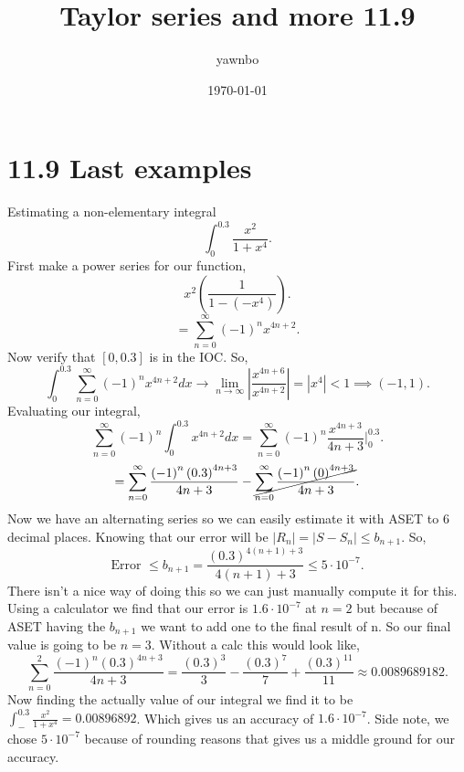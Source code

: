 \documentclass[a4paper]{article}
\title{Taylor series and more 11.9}
\author{yawnbo}
\date{\today}
\begin{document}
\maketitle
\section{11.9 Last examples}%
\label{sec:11.9 Last example}
\begin{exampleblock}{Estimating a non-elementary integral}
\[
\int_{ 0 }^{ 0.3 } \frac{ x^2 }{ 1+x^{ 4 } }
.\] 
First make a power series for our function,
\[
x^2\left( \frac{ 1 }{ 1-\left( -x^{ 4 } \right)  }  \right) 
.\] 
\[
=\sum_{ n=0 } ^{ \infty } \left( -1 \right) ^{ n }x^{ 4n+2 }
.\] 
Now verify that $ \left[ 0,0.3 \right]  $ is in the IOC. So,
\[
\int_{ 0 }^{ 0.3 } \sum_{ n=0 } ^{ \infty } \left( -1 \right) ^{ n }x^{ 4n+2 }dx \to \lim_{ n \to \infty} \left| \frac{ x^{ 4n+6 } }{ x^{ 4n+2 } } \right|= \left| x^{ 4 } \right| < 1 \implies \left( -1,1 \right) 
.\] 
Evaluating our integral,
\[
\sum_{ n=0 } ^{ \infty } \left( -1 \right) ^{ n }\int_{ 0 }^{ 0.3 } x^{ 4n+2 }dx = \sum_{ n=0 } ^{ \infty } \left( -1 \right) ^{ n } \frac{ x^{ 4n+3 } }{ 4n + 3 } \bigg| _{ 0 }^{ 0.3 }
.\] 
\[
	=\sum_{ n=0 } ^{ \infty } \frac{ \left( -1 \right) ^{ n } \left( 0.3 \right) ^{ 4n+3 } }{ 4n+3 } - \cancel{\sum_{ n=0 } ^{ \infty } \frac{ \left( -1 \right) ^{ n }\left( 0 \right) ^{ 4n+3 } }{ 4n+3 }}
.\] 
Now we have an alternating series so we can easily estimate it with ASET to 6 decimal places. Knowing that our error will be $ \left| R_n \right|= \left| S-S_n \right| \le b_{ n+1 } $. So,
\[
\text{Error }\le b_{ n+1 } = \frac{ \left( 0.3 \right) ^{ 4\left( n+1 \right) +3 } }{ 4\left( n+1 \right) +3 } \le 5\cdot 10^{ -7 }
.\] 
There isn't a nice way of doing this so we can just manually compute it for this. Using a calculator we find that our error is $ 1.6\cdot 10^{ -7 } $ at $ n=2 $ but because of ASET having the $ b_{ n+1 } $ we want to add one to the final result of n. So our final value is going to be $ n=3 $. Without a calc this would look like,
\[
\sum_{ n=0 } ^{ 2 } \frac{ \left( -1 \right) ^{ n }\left( 0.3 \right) ^{ 4n+3 } }{ 4n+3 } = \frac{ \left( 0.3 \right) ^{ 3 } }{ 3 } - \frac{ \left( 0.3 \right) ^{ 7 } }{ 7 } + \frac{ \left( 0.3 \right) ^{ 11 } }{ 11 } \approx 0.0089689182
.\] 
\newpage
Now finding the actually value of our integral we find it to be $ \int_{ - }^{ 0.3 } \frac{ x^2 }{ 1+x^{ 4 } } = 0.00896892$. Which gives us an accuracy of $ 1.6\cdot 10^{ -7 } $. Side note, we chose $ 5\cdot 10^{ -7 } $ because of rounding reasons that gives us a middle ground for our accuracy. \\

\end{exampleblock}
\end{document}
